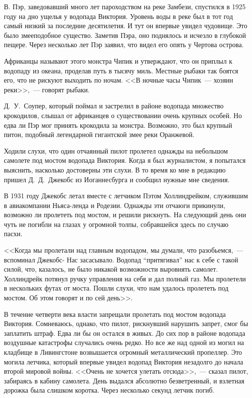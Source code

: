 \documentclass[12pt,a4paper,twoside,openany,svgnames]{memoir}
\begin{document}
В. Пэр, заведовавший много лет пароходством на реке Замбези, спустился в 1925 году на дно ущелья у водопада Виктория. Уровень воды в реке был в тот год самый низкий за последние десятилетия. И тут он впервые увидел чудовище. Это было змееподобное существо. Заметив Пэра, оно поднялось и исчезло в глубокой пещере. Через несколько лет Пэр заявил, что видел его опять у Чертова острова.

Африканцы называют этого монстра Чипик и утверждают, что он приплыл к водопаду из океана, проделав путь в тысячу миль. Местные рыбаки так боятся его, что не рискуют выходить по ночам. <<В ночные часы Чипик~--- хозяин реки>>,~--- говорят рыбаки.

Д.~У.~Соупер, который поймал и застрелил в районе водопада множество крокодилов, слышал от африканцев о существовании очень крупных особей. Но едва ли Пэр мог принять крокодила за монстра. Возможно, это был крупный питон, подобный легендарной гигантской змее реки Оранжевой.

Ходили слухи, что один отчаянный пилот пролетел однажды на небольшом самолете под мостом водопада Виктория. Когда я был журналистом, я попытался выяснить, насколько достоверны эти слухи. В то время ко мне в редакцию пришел Д.~Д.~Джекобс из Иоганнесбурга и сообщил нужные мне сведения.

В 1931 году Джекобс летал вместе с летчиком Пэтом Холлиндрейком, служившим в авиакомпании Ньяса-ленда и Родезии. Однажды эти отчаюги прикинули, возможно ли пролететь под мостом, и решили рискнуть. На следующий день они чуть не погибли на глазах у огромной толпы, собравшейся здесь по случаю пасхи.

<<Когда мы пролетали над главным водопадом, мы думали, что разобьемся,~--- вспоминал Джекобс- Нас засасывало. Водопад ``притягивал'' нас к себе с такой силой, что, казалось, не было никакой возможности выровнять самолет. Холлиндрейк потянул ручку управления на себя и дал полный газ. Мы пролетели в нескольких футах от моста. Пошли слухи, что нам удалось пролететь под мостом. Об этом говорят и по сей день>>.

В течение четверти века власти запрещали пролетать под мостом водопада Виктория. Сомневаюсь, однако, что пилот, рискнувший нарушить запрет, смог бы заплатить штраф. Едва ли бы он остался в живых. До сих пор в районе водопада воздушные катастрофы случались очень редко. Но все же над одной из могил на кладбище в Ливингстоне возвышается огромный металлический пропеллер. Это могила летчика, который впервые увидел водопад Виктория незадолго до начала второй мировой войны. <<Очень не хочется улетать отсюда>>,~--- сказал пилот, забираясь в кабину самолета. День выдался абсолютно безветренный, и взлетная дорожка была слишком коротка. Через несколько секунд летчик погиб.
\end{document}
